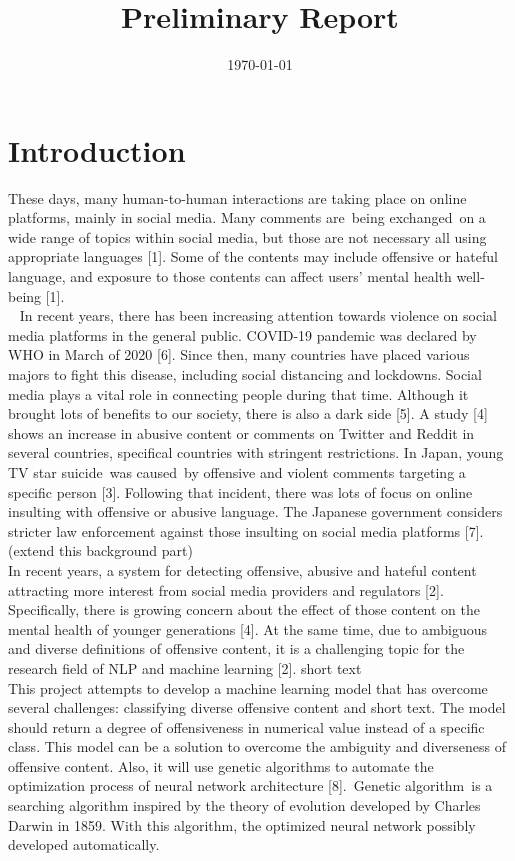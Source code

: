 \documentclass[12pt, natbib=false]{article}
\date{\today}
\title{Preliminary Report}
\begin{document}
\maketitle

\section{Introduction}
These days, many human-to-human interactions are taking place on online platforms, mainly in social media. Many comments are being exchanged on a wide range of topics within social media, but those are not necessary all using appropriate languages [1]. Some of the contents may include offensive or hateful language, and exposure to those contents can affect users’ mental health well-being [1]. \\ 
In recent years, there has been increasing attention towards violence on social media platforms in the general public. COVID-19 pandemic was declared by WHO in March of 2020 [6]. Since then, many countries have placed various majors to fight this disease, including social distancing and lockdowns. Social media plays a vital role in connecting people during that time. Although it brought lots of benefits to our society, there is also a dark side [5]. A study [4] shows an increase in abusive content or comments on Twitter and Reddit in several countries, specifical countries with stringent restrictions. In Japan, young TV star suicide was caused by offensive and violent comments targeting a specific person [3]. Following that incident, there was lots of focus on online insulting with offensive or abusive language. The Japanese government considers stricter law enforcement against those insulting on social media platforms [7]. (extend this background part) \\
In recent years, a system for detecting offensive, abusive and hateful content attracting more interest from social media providers and regulators [2]. Specifically, there is growing concern about the effect of those content on the mental health of younger generations [4]. At the same time, due to ambiguous and diverse definitions of offensive content, it is a challenging topic for the research field of NLP and machine learning [2]. short text \\
This project attempts to develop a machine learning model that has overcome several challenges: classifying diverse offensive content and short text. The model should return a degree of offensiveness in numerical value instead of a specific class. This model can be a solution to overcome the ambiguity and diverseness of offensive content. Also, it will use genetic algorithms to automate the optimization process of neural network architecture [8]. Genetic algorithm is a searching algorithm inspired by the theory of evolution developed by Charles Darwin in 1859. With this algorithm, the optimized neural network possibly developed automatically. \\
\end{document}
